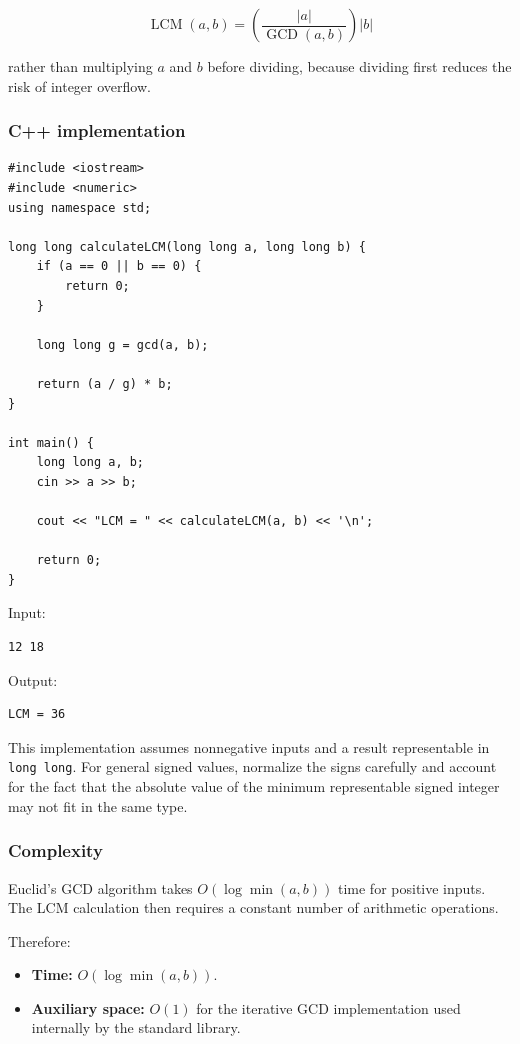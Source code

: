 \[
\boxed{\operatorname{LCM}(a,b)=\left(\frac{|a|}{\operatorname{GCD}(a,b)}\right)|b|}
\]


rather than multiplying $a$ and $b$ before dividing, because dividing first reduces the risk of integer overflow.

\subsubsection{C++ implementation}

\begin{lstlisting}[style=cppstyle]
#include <iostream>
#include <numeric>
using namespace std;

long long calculateLCM(long long a, long long b) {
    if (a == 0 || b == 0) {
        return 0;
    }

    long long g = gcd(a, b);

    return (a / g) * b;
}

int main() {
    long long a, b;
    cin >> a >> b;

    cout << "LCM = " << calculateLCM(a, b) << '\n';

    return 0;
}
\end{lstlisting}

Input:

\begin{lstlisting}[style=pseudocode]
12 18
\end{lstlisting}

Output:

\begin{lstlisting}[style=pseudocode]
LCM = 36
\end{lstlisting}

This implementation assumes nonnegative inputs and a result representable in \texttt{long long}. For general signed values, normalize the signs carefully and account for the fact that the absolute value of the minimum representable signed integer may not fit in the same type.

\subsubsection{Complexity}

Euclid's GCD algorithm takes $O(\log\min(a,b))$ time for positive inputs. The LCM calculation then requires a constant number of arithmetic operations.

Therefore:

\begin{itemize}
    \item \textbf{Time:} $O(\log\min(a,b))$.
    \item \textbf{Auxiliary space:} $O(1)$ for the iterative GCD implementation used internally by the standard library.
\end{itemize}

